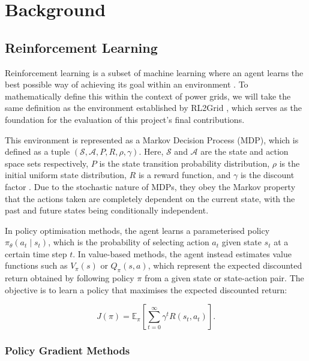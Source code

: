 \chapter{Background}
\label{ch:background}


\section{Reinforcement Learning}

Reinforcement learning is a subset of machine learning where an agent learns the best possible way of achieving its goal within an environment \cite{sutton1998reinforcement}. To mathematically define this within the context of power grids, we will take the same definition as the environment established by RL2Grid \cite{marchesini2025rl2grid}, which serves as the foundation for the evaluation of this project's final contributions. 

This environment is represented as a Markov Decision Process (MDP), which is defined as a tuple $(\mathcal{S}, \mathcal{A}, P, R, \rho, \gamma)$. Here, $\mathcal{S}$ and $\mathcal{A}$ are the state and action space sets respectively, $P$ is the state transition probability distribution, $\rho$ is the initial uniform state distribution, $R$ is a reward function, and $\gamma$ is the discount factor \cite{marchesini2025rl2grid}. Due to the stochastic nature of MDPs, they obey the Markov property that the actions taken are completely dependent on the current state, with the past and future states being conditionally independent.

In policy optimisation methods, the agent learns a parameterised policy $\pi_{\theta}(a_t \mid s_t)$, which is the probability of selecting action $a_t$ given state $s_t$ at a certain time step $t$. In value-based methods, the agent instead estimates value functions such as $V_{\pi}(s)$ or $Q_{\pi}(s,a)$, which represent the expected discounted return obtained by following policy $\pi$ from a given state or state-action pair. The objective is to learn a policy that maximises the expected discounted return:

\begin{equation}
    J(\pi) =
    \mathbb{E}_{\pi}\left[
    \sum_{t=0}^{\infty} \gamma^t R(s_t, a_t)
    \right].
    \label{eq:rl_objective}
\end{equation}

\subsection{Policy Gradient Methods}

